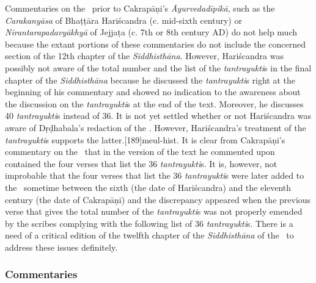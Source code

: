 Commentaries on the \CS\ prior to Cakrapāṇi's \emph{Āyurvedadīpikā}, such as the 
\emph{Carakanyāsa} of Bhaṭṭāra Hariścandra (c. mid-sixth century) or 
\emph{Nirantarapadavyākhyā} of Jejjaṭa (c. 7th or 8th century AD) do not help 
much because the extant portions of these commentaries do not include the 
concerned section of the 12th chapter of the \emph{Siddhisthāna}. However, Hariścandra was possibly not aware of the total 
number and the list of the \emph{tantrayukti}s in the final chapter of the 
\emph{Siddhisthāna} because he discussed the \emph{tantrayukti}s right at the 
beginning of his commentary and showed no indication to the awareness about the 
discussion on the \emph{tantrayukti}s at the end of the text. Moreover, he 
discusses 40 \emph{tantrayukti}s instead of 36. It is not yet settled whether or not 
Hariścandra was aware of Dṛḍhabala's redaction of the \CS. However, Hariścandra's 
treatment of the \emph{tantrayukti}s supports the latter.[189]{meul-hist}.  It 
is clear from Cakrapāṇi's commentary on the \CS\ that in the version of the text he 
commented upon contained the four verses that list the 36 \emph{tantrayukti}s. It 
is, however, not improbable that the four verses that list the 36 
\emph{tantrayukti}s were later added to the \CS\ sometime between the sixth (the 
date of Hariścandra) and the eleventh century (the date of Cakrapāṇi) and the 
discrepancy appeared when the previous verse that gives the total number of the 
\emph{tantrayukti}s was not properly emended by the scribes complying with the 
following list of 36 \emph{tantrayukti}s. There is a need of a critical edition of the 
twelfth chapter of the \emph{Siddhisthāna} of the \CS\ to address these issues 
definitely.  

\subsubsection{Commentaries}\label{commentaries}


